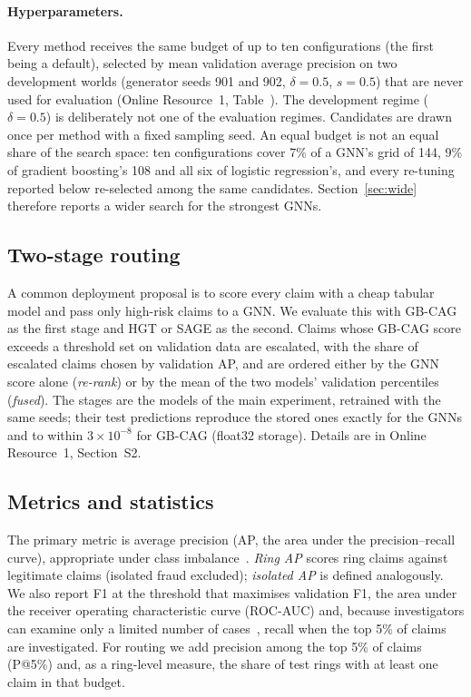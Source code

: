 \documentclass[pdflatex,sn-vancouver-num]{sn-jnl}
\newcommand{\SSecRouting}{S2}\newcommand{\STabRouting}{S2}\newcommand{\SFigRouting}{S1}
\begin{document}
\paragraph{Hyperparameters.} Every method receives the same budget of up to
ten configurations (the first being a default), selected by mean validation
average precision on two development worlds (generator seeds 901 and 902,
$\delta=0.5$, $s=0.5$) that are never used for evaluation
(Online Resource~1, Table~\STabHyper). The development regime ($\delta=0.5$) is
deliberately not one of the evaluation regimes. Candidates are drawn once per
method with a fixed sampling seed. An equal budget is not an equal share of the
search space: ten configurations cover 7\% of a GNN's grid of 144, 9\% of
gradient boosting's 108 and all six of logistic regression's, and every
re-tuning reported below re-selected among the same candidates.
Section~\ref{sec:wide} therefore reports a wider search for the strongest GNNs.

\subsection{Two-stage routing}\label{sec:routing}
A common deployment proposal is to score every claim with a cheap tabular
model and pass only high-risk claims to a GNN. We evaluate this with GB-CAG
as the first stage and HGT or SAGE as the second. Claims whose GB-CAG score
exceeds a threshold set on validation data are escalated, with the share of
escalated claims chosen by validation AP, and are ordered either by the GNN
score alone (\emph{re-rank}) or by the mean of the two models' validation
percentiles (\emph{fused}). The stages are the models of the main
experiment, retrained with the same seeds; their test predictions reproduce
the stored ones exactly for the GNNs and to within $3\times10^{-8}$ for
GB-CAG (float32 storage). Details are in Online Resource~1,
Section~\SSecRouting.

\subsection{Metrics and statistics}\label{sec:stats}
The primary metric is average precision (AP, the area under the
precision--recall curve), appropriate under class imbalance~\cite{saito2015pr}.
\emph{Ring AP} scores ring claims against legitimate claims (isolated fraud
excluded); \emph{isolated AP} is defined analogously. We also report F1 at
the threshold that maximises validation F1, the area under the receiver
operating characteristic curve (ROC-AUC) and, because investigators can
examine only a limited number of cases~\cite{dalpozzolo2018}, recall when the
top 5\% of claims are investigated. For routing we add precision among the
top 5\% of claims (P@5\%) and, as a ring-level measure, the share of test
rings with at least one claim in that budget.
\end{document}
